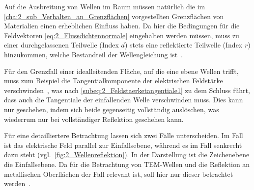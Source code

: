 Auf die Ausbreitung von Wellen im Raum müssen natürlich die im \Abschnitt \ref{cha:2_sub_Verhalten_an_Grenzflächen} vorgestellten Grenzflächen von Materialien einen erheblichen Einfluss haben. Da hier die Bedingungen für die Feldvektoren \Gleichungen\eqref{eq:2_Flussdichtennormale} eingehalten werden müssen, muss zu einer durchgelassenen Teilwelle (Index \glqq$d$\grqq) stets eine reflektierte Teilwelle (Index \glqq$r$\grqq) hinzukommen, welche Bestandteil der Wellengleichung ist~\cite{EM_Schirmung}.
\par
\vspace{\linespace}
Für den Grenzfall einer idealleitenden Fläche, auf die eine ebene Wellen trifft, muss zum Beispiel die Tangentialkomponente der elektrischen Feldstärke verschwinden~\cite{EM_Schirmung}, was nach \Gleichung \eqref{subeq:2_Feldstaerketangentiale1} zu dem Schluss führt, dass auch die Tangentiale der einfallenden Welle verschwinden muss. Dies kann nur geschehen, indem sich beide gegenseitig vollständig auslöschen, was wiederrum nur bei vollständiger Reflektion geschehen kann.
\par
\vspace{\linespace}
Für eine detailliertere Betrachtung lassen sich zwei Fälle unterscheiden. Im Fall  ist das elektrische Feld parallel zur Einfallsebene, während es im Fall  senkrecht dazu steht (vgl.~\Abb \ref{fig:2_Wellenreflektion}). In der Darstellung ist die Zeichenebene die Einfallsebene. Da für die Betrachtung von TEM-Wellen und die Reflektion an metallischen Oberflächen der Fall  relevant ist, soll hier nur dieser betrachtet werden~\cite{EM_Schirmung}.
\par
\vspace{\linespace}

